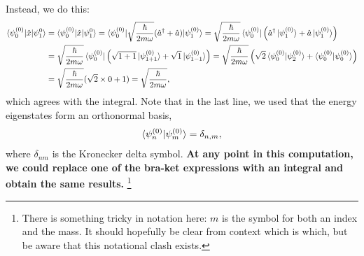 \documentclass[10pt]{article}
\newcommand{\1}{\mathbf 1}
\begin{document}
\noindent
Instead, we do this:
\begin{align}
	\braket{\psi_0^{(0)} | \hat x|\psi_{1}^{0}}
	&=\nonumber
	\braket{\psi_0^{(0)} | \hat x|\psi_{1}^{0}}
	=
	\braket{\psi_0^{(0)}|
	\sqrt{\frac{\hbar}{2m\omega}}
	(\hat a^\dagger + \hat a)
	|
	\psi_1^{(0)}
	}
	=
	\sqrt{\frac{\hbar}{2m\omega}}
	\bra{\psi_0^{(0)}}\left(
		\hat a^\dagger\ket{\psi_1^{(0)}} + \hat a\ket{\psi_1^{(0)}}
	\right)\\
	&=\nonumber
	\sqrt{\frac{\hbar}{2m\omega}}
	\bra{\psi_0^{(0)}}\left(
		\sqrt{1+1}\ket{\psi_{1+1}^{(0)}} + \sqrt{1}\ket{\psi_{1-1}^{(0)}}
	\right)
	=
	\sqrt{\frac{\hbar}{2m\omega}}
	\left(
		\sqrt{2}
		\braket{\psi_0^{(0)}|\psi_2^{(0)}}
		+
		\braket{\psi_0^{(0)}|\psi_0^{(0)}}
	\right)\\
	&=
	\sqrt{\frac{\hbar}{2m\omega}}
	(\sqrt{2} \times 0 + 1)
	=
	\sqrt{\frac{\hbar}{2m\omega}},
\end{align}
which agrees with the integral.
Note that in the last line, we used that the energy eigenstates form an orthonormal basis,
\begin{align}
	\braket{\psi_n^{(0)}|\psi_m^{(0)}}
	=
	\delta_{n,m},
\end{align}
where $\delta_{nm}$ is the Kronecker delta symbol.
{\bf At any point in this computation, we could replace one of the bra-ket expressions with an integral and obtain the same results.}
\footnote{
	There is something tricky in notation here: $m$ is the symbol for both an index and the mass.
	It should hopefully be clear from context which is which, but be aware that this notational clash exists.
}
\end{document}
